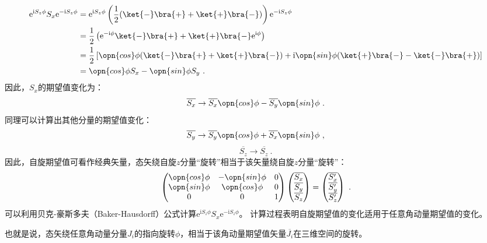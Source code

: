 \begin{equation}
\begin{aligned}
\mathrm e^{\mathrm i S_z\phi}S_x\mathrm e^{-\mathrm i S_z\phi}&=\mathrm e^{\mathrm i S_z\phi}\left(\frac{1}{2}(\ket{-}\bra{+}+\ket{+}\bra{-})\right)\mathrm e^{-\mathrm i S_z\phi}\\
 &=\frac{1}{2}\left(\mathrm e^{-\mathrm i \phi}\ket{-}\bra{+}+\ket{+}\bra{-}\mathrm e^{\mathrm i \phi}\right)\\
 &=\frac{1}{2}\left[\opn{cos}\phi(\ket{-}\bra{+}+\ket{+}\bra{-})+\mathrm i\opn{sin}\phi(\ket{+}\bra{-}-\ket{-}\bra{+})\right]\\
 &=\opn{cos}\phi S_x-\opn{sin}\phi S_y~.
\end{aligned}
\end{equation}
因此，$S_x$的期望值变化为：
\begin{equation}
\overline{S_x}\rightarrow  \overline{S_x}\opn{cos}\phi-\overline{S_y}\opn{sin}\phi~.
\end{equation}
同理可以计算出其他分量的期望值变化：
\begin{equation}
\overline{S_y}\rightarrow \overline{S_y}\opn{cos}\phi+\overline{S_x}\opn{sin}\phi~,
\end{equation}
\begin{equation}
\overline{S_z}\rightarrow \overline{S_z}~.
\end{equation}
因此，自旋期望值可看作经典矢量，态矢绕自旋$z$分量“旋转”相当于该矢量绕自旋$z$分量“旋转”：
\begin{equation}
\begin{pmatrix}
 \opn{cos}\phi &-\opn{sin}\phi  &0 \\
  \opn{sin}\phi & \opn{cos}\phi  & 0\\
  0& 0 &1
\end{pmatrix}
\begin{pmatrix}
 \overline{S_x}\\
  \overline{S_y}\\
 \overline{S_z}
\end{pmatrix}
=
\begin{pmatrix}
  \overline{S'_x}\\
  \overline{S'_y}\\
 \overline{S'_z}
\end{pmatrix}~.
\end{equation}
可以利用贝克-豪斯多夫（Baker-Hausdorff）公式计算$\mathrm e^{\mathrm i S_z\phi}S_x\mathrm e^{-\mathrm i S_z\phi}$。
计算过程表明自旋期望值的变化适用于任意角动量期望值的变化。

也就是说，态矢绕任意角动量分量$J_i$的指向旋转$\phi$，相当于该角动量期望值矢量$\overline{J_i}$在三维空间的旋转。

